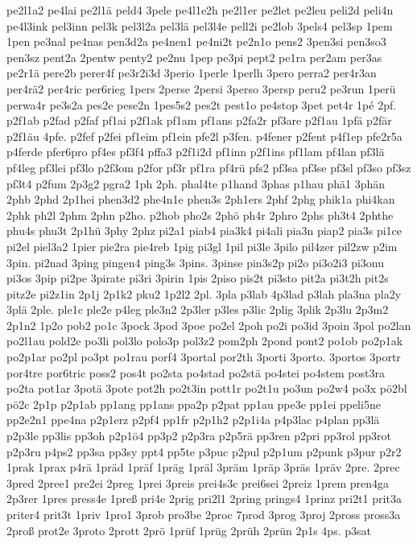 {pe2l1a2
pe4lai
pe2l1ä
peld4
3pele
pe4l1e2h
pe2l1er
pe2let
pe2leu
peli2d
peli4n
pe4l3ink
pel3inn
pel3k
pel3l2a
pel3lä
pel3l4e
pell2i
pe2lob
3pels4
pel3sp
1pem
1pen
pe3nal
pe4nas
pen3d2a
pe4nen1
pe4ni2t
pe2n1o
pens2
3pen3si
pen3so3
pen3sz
pent2a
2pentw
penty2
pe2nu
1pep
pe3pi
pept2
pe1ra
per2am
per3as
pe2r1ä
pere2b
perer4f
pe3r2i3d
3perio
1perle
1perlh
3pero
perra2
per4r3an
per4rä2
per4ric
per6rieg
1pers
2perse
2persi
3perso
3persp
peru2
pe3run
1perü
perwa4r
pe3s2a
pes2e
pese2n
1pes5s2
pes2t
pest1o
pe4stop
3pet
pet4r
1pé
2pf.
p2f1ab
p2fad
p2faf
pf1ai
p2f1ak
pf1am
pf1ans
p2fa2r
pf3are
p2f1au
1pfä
p2fär
p2f1äu
4pfe.
p2fef
p2fei
pf1eim
pf1ein
pfe2l
p3fen.
p4fener
p2fent
p4f1ep
pfe2r5a
p4ferde
pfer6pro
pf4es
pf3f4
pffa3
p2f1i2d
pf1inn
p2f1ins
pf1lam
pf4lan
pf3lä
pf4leg
pf3lei
pf3lo
p2f3om
p2for
pf3r
pf1ra
pf4rü
pfs2
pf3sa
pf3se
pf3sl
pf3so
pf3sz
pf3t4
p2fum
2p3g2
pgra2
1ph
2ph.
phal4te
p1hand
3phas
p1hau
phä1
3phän
2phb
2phd
2p1hei
phen3d2
phe4n1e
phen3s
2ph1ers
2phf
2phg
phik1a
phi4kan
2phk
ph2l
2phm
2phn
p2ho.
p2hob
pho2s
2phö
ph4r
2phro
2phs
ph3t4
2phthe
phu4s
phu3t
2p1hü
3phy
2phz
pi2a1
piab4
pia3k4
pi4ali
pia3n
piap2
pia3s
pi1ce
pi2el
piel3a2
1pier
pie2ra
pie4reb
1pig
pi3gl
1pil
pi3le
3pilo
pil4zer
pil2zw
p2im
3pin.
pi2nad
3ping
pingen4
ping3s
3pins.
3pinse
pin3s2p
pi2o
pi3o2i3
pi3onu
pi3os
3pip
pi2pe
3pirate
pi3ri
3pirin
1pis
2piso
pis2t
pi3sto
pit2a
pi3t2h
pit2s
pitz2e
pi2z1in
2p1j
2p1k2
pku2
1p2l2
2pl.
3pla
p3lab
4p3lad
p3lah
pla3na
pla2y
3plä
2ple.
ple1c
ple2e
p4leg
ple3n2
2p3ler
p3les
p3lic
2plig
3plik
2p3lu
2p3m2
2p1n2
1p2o
pob2
po1c
3pock
3pod
3poe
po2el
2poh
po2i
po3id
3poin
3pol
po2lan
po2l1au
pold2e
po3li
pol3lo
polo3p
pol3z2
pom2ph
2pond
pont2
po1ob
po2p1ak
po2p1ar
po2pl
po3pt
po1rau
porf4
3portal
por2th
3porti
3porto.
3portos
3portr
por4tre
por6tric
poss2
pos4t
po2sta
po4stad
po2stä
po4stei
po4stem
post3ra
po2ta
pot1ar
3potä
3pote
pot2h
po2t3in
pott1r
po2t1u
po3un
po2w4
po3x
pö2bl
pö2c
2p1p
p2p1ab
pp1ang
pp1ans
ppa2p
p2pat
pp1au
ppe3e
pp1ei
ppeli5ne
pp2e2n1
ppe4na
p2p1erz
p2pf4
pp1fr
p2p1h2
p2p1i4a
p4p3lac
p4plan
pp3lä
p2p3le
pp3lis
pp3oh
p2p1ö4
pp3p2
p2p3ra
p2p5rä
pp3ren
p2pri
pp3rol
pp3rot
p2p3ru
p4ps2
pp3sa
pp3sy
ppt4
pp5te
p3puc
p2pul
p2p1um
p2punk
p3pur
p2r2
1prak
1prax
p4rä
1präd
1präf
1präg
1präl
3präm
1präp
3präs
1präv
2pre.
2prec
3pred
2pree1
pre2ei
2preg
1prei
3preis
prei4s3c
prei6sei
2preiz
1prem
pren4ga
2p3rer
1pres
press4e
1preß
pri4e
2prig
pri2l1
2pring
prings4
1prinz
pri2t1
prit3a
priter4
prit3t
1priv
1pro1
3prob
pro3be
2proc
7prod
3prog
3proj
2pross
pross3a
2proß
prot2e
3proto
2prott
2prö
1prüf
1prüg
2prüh
2prün
2p1s
4ps.
p3sat
}
